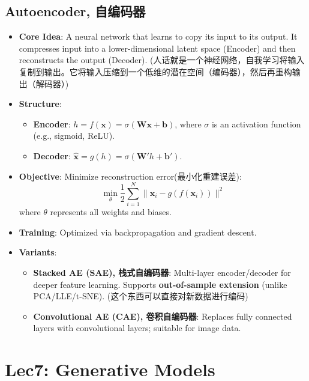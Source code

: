 \documentclass[UTF8]{ctexart}
\begin{document}
\subsection{Autoencoder, 自编码器}
\begin{itemize}
    \item \textbf{Core Idea}: A neural network that learns to copy its input to its output. It compresses input into a lower-dimensional latent space (Encoder) and then reconstructs the output (Decoder).
    (人话就是一个神经网络，自我学习将输入复制到输出。它将输入压缩到一个低维的潜在空间（编码器），然后再重构输出（解码器）)
    \item \textbf{Structure}:
    \begin{itemize}
        \item \textbf{Encoder}: $h = f(\mathbf{x}) = \sigma(\mathbf{W}\mathbf{x} + \mathbf{b})$, where $\sigma$ is an activation function (e.g., sigmoid, ReLU).
        \item \textbf{Decoder}: $\hat{\mathbf{x}} = g(h) = \sigma(\mathbf{W}'h + \mathbf{b}')$.
    \end{itemize}
    \item \textbf{Objective}: Minimize reconstruction error(最小化重建误差):
    $$\min_{\theta} \frac{1}{2} \sum_{i=1}^N \|\mathbf{x}_i - g(f(\mathbf{x}_i))\|^2$$
    where $\theta$ represents all weights and biases.
    \item \textbf{Training}: Optimized via backpropagation and gradient descent.
\newpage
    \item \textbf{Variants}:
    \begin{itemize}
        \item \textbf{Stacked AE (SAE), 栈式自编码器}: Multi-layer encoder/decoder for deeper feature learning. Supports \textbf{out-of-sample extension} (unlike PCA/LLE/t-SNE).
        (这个东西可以直接对新数据进行编码)
        \item \textbf{Convolutional AE (CAE), 卷积自编码器}: Replaces fully connected layers with convolutional layers; suitable for image data.
    \end{itemize}
\end{itemize}

\section{Lec7: Generative Models}
\end{document}
